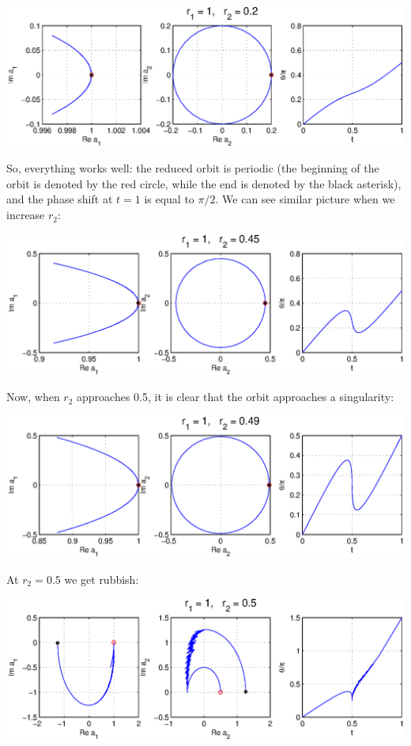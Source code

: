 \vspace{2ex}\noindent\includegraphics[width=\textwidth]{sliceflow1.eps}

So, everything works well: the reduced orbit is periodic (the beginning of the orbit is denoted by the red circle, while the end is denoted by the black asterisk), and the phase shift at $t = 1$ is equal to $\pi/2$.  We can see similar picture when we increase $r_2$:

\vspace{2ex}\noindent\includegraphics[width=\textwidth]{sliceflow2.eps}

Now, when $r_2$ approaches 0.5, it is clear that the orbit approaches a singularity:

\vspace{2ex}\noindent\includegraphics[width=\textwidth]{sliceflow3.eps}

At $r_2 = 0.5$ we get rubbish:

\vspace{2ex}\noindent\includegraphics[width=\textwidth]{sliceflow4.eps}

